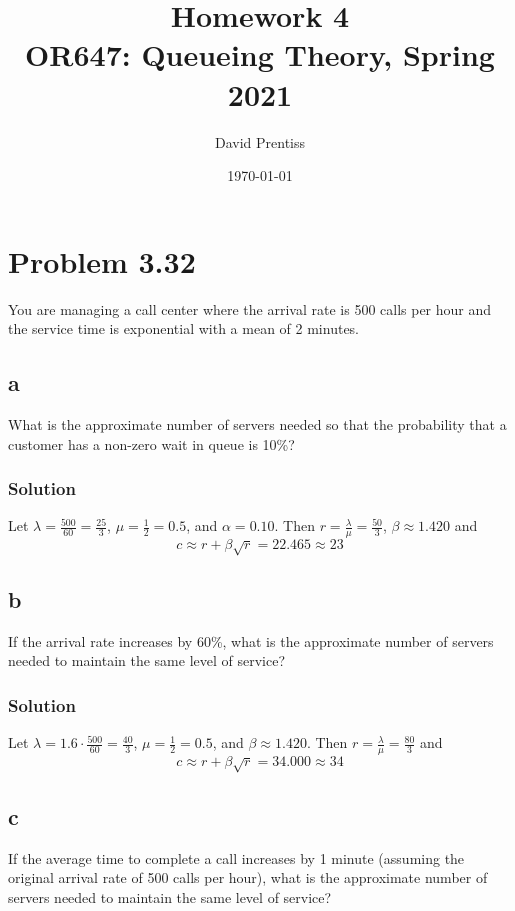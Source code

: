 \documentclass[letterpaper]{amsart}
\title[Homework 2]{Homework 4 \\ OR647: Queueing Theory, Spring 2021}
\author{David Prentiss}
\date{\today}
\begin{document}
\maketitle

\section{Problem 3.32} %
You are managing a call center where the arrival rate is 500 calls per hour
and the service time is exponential with a mean of 2 minutes.
\subsection*{a}
What is the approximate number of servers needed so that the probability that a
customer has a non-zero wait in queue is 10\%?

\subsubsection*{Solution}
Let $\lambda = \frac{500}{60}=\frac{25}{3}$, $\mu=\frac{1}{2}=0.5$, and $\alpha=0.10$. Then
$r=\frac{\lambda}{\mu}=\frac{50}{3}$, $\beta\approx1.420$ and
\begin{equation*}
  c\approx r + \beta\sqrt{r} = 22.465 \approx 23
\end{equation*}

\subsection*{b}
If the arrival rate increases by 60\%, what is the approximate number of
servers needed to maintain the same level of service?

\subsubsection*{Solution}
Let $\lambda = 1.6\cdot\frac{500}{60}=\frac{40}{3}$, $\mu=\frac{1}{2}=0.5$,
and $\beta\approx1.420$. Then $r=\frac{\lambda}{\mu}=\frac{80}{3}$ and
\begin{equation*}
  c\approx r + \beta\sqrt{r} = 34.000 \approx 34
\end{equation*}

\subsection*{c}
If the average time to complete a call increases by 1 minute (assuming
the original arrival rate of 500 calls per hour), what is the approximate
number of servers needed to maintain the same level of service?
\end{document}

